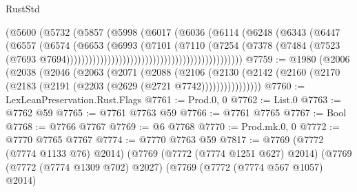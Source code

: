 \begin{lexlean}{RustStd}
\begin{coremodule}
                                                        (@5600
                                                          (@5732
                                                            (@5857
                                                              (@5998
                                                                (@6017
                                                                  (@6036
                                                                    (@6114
                                                                      (@6248
                                                                        (@6343
                                                                          (@6447
                                                                            (@6557
                                                                              (@6574
                                                                                (@6653
                                                                                  (@6993
                                                                                    (@7101
                                                                                      (@7110
                                                                                        (@7254
                                                                                          (@7378
                                                                                            (@7484
                                                                                              (@7523
                                                                                                (@7693
                                                                                                  @7694)))))))))))))))))))))))))))))))))))))))))))))))
@7759 := @1980
    (@2006
      (@2038
        (@2046
          (@2063
            (@2071
              (@2088
                (@2106
                  (@2130
                    (@2142 (@2160 (@2170 (@2183 (@2191 (@2203 (@2629 (@2721 @7742))))))))))))))))
@7760 := LexLeanPreservation.Rust.Flags
@7761 := Prod.{0, 0}
@7762 := List.{0}
@7763 := @7762 @59
@7765 := @7761 @7763 @59
@7766 := @7761 @7765
@7767 := Bool
@7768 := @7766 @7767
@7769 := @6 @7768
@7770 := Prod.mk.{0, 0}
@7772 := @7770 @7765 @7767
@7774 := @7770 @7763 @59
@7817 := @7769
    (@7772 (@7774 @1133 @76) @2014)
    (@7769
      (@7772 (@7774 @1251 @627) @2014)
      (@7769
        (@7772 (@7774 @1309 @702) @2027)
        (@7769
          (@7772 (@7774 @567 @1057) @2014)

\end{coremodule}
\end{lexlean}
